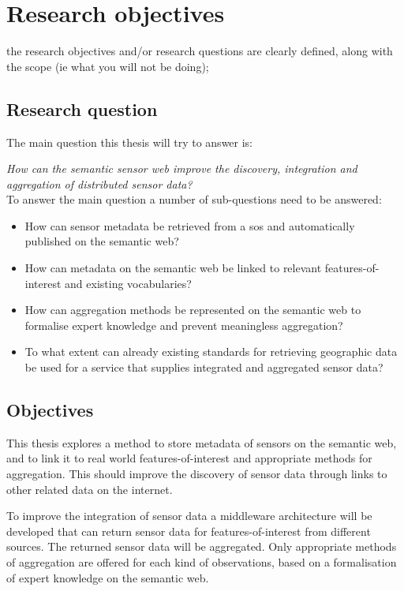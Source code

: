 
\chapter{Research objectives}
\label{chap:objectives}

the research objectives and/or research questions are clearly defined, along with the scope (ie what you will not be doing);\\

\section{Research question} 
The main question this thesis will try to answer is: 

\textit{How can the semantic sensor web improve the discovery, integration and aggregation of distributed sensor data?}\\

To answer the main question a number of sub-questions need to be answered:
\begin{itemize}
	\item How can sensor metadata be retrieved from a \ac{sos} and automatically published on the semantic web?
	\item How can metadata on the semantic web be linked to relevant features-of-interest and existing vocabularies?
	\item How can aggregation methods be represented on the semantic web to formalise expert knowledge and prevent meaningless aggregation?
	\item To what extent can already existing standards for retrieving geographic data be used for a service that supplies integrated and aggregated sensor data?
\end{itemize}

\section{Objectives}

This thesis explores a method to store metadata of sensors on the semantic web, and to link it to real world features-of-interest and appropriate methods for aggregation. This should improve the discovery of sensor data through links to other related data on the internet.  

To improve the integration of sensor data a middleware architecture will be developed that can return sensor data for features-of-interest from different sources. The returned sensor data will be aggregated. Only appropriate methods of aggregation are offered for each kind of observations, based on a formalisation of expert knowledge on the semantic web.

